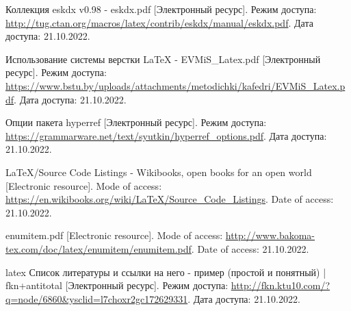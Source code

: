   \renewcommand{\addcontentsline}[3]{}%
  \renewcommand{\section}[2]{}%

  \begin{thebibliography}{}
    Коллекция eskdx v0.98 - eskdx.pdf
    [Электронный ресурс].
    Режим доступа: \url{http://tug.ctan.org/macros/latex/contrib/eskdx/manual/eskdx.pdf}.
    Дата доступа: 21.10.2022.
  
    Использование системы верстки LaTeX - EVMiS\_Latex.pdf
    [Электронный ресурс].
    Режим доступа: \url{https://www.bstu.by/uploads/attachments/metodichki/kafedri/EVMiS_Latex.pdf}.
    Дата доступа: 21.10.2022.
  
    Опции пакета hyperref
    [Электронный ресурс].
    Режим доступа: \url{https://grammarware.net/text/syutkin/hyperref_options.pdf}.
    Дата доступа: 21.10.2022.
  
    LaTeX/Source Code Listings - Wikibooks, open books for an open world
    [Electronic resource].
    Mode of access: \url{https://en.wikibooks.org/wiki/LaTeX/Source_Code_Listings}.
    Date of access: 21.10.2022.
  
    enumitem.pdf
    [Electronic resource].
    Mode of access: \url{http://www.bakoma-tex.com/doc/latex/enumitem/enumitem.pdf}.
    Date of access: 21.10.2022.
  
    latex Список литературы и ссылки на него - пример (простой и понятный) | fkn+antitotal
    [Электронный ресурс].
    Режим доступа: \url{http://fkn.ktu10.com/?q=node/6860&ysclid=l7choxr2gc172629331}.
    Дата доступа: 21.10.2022.
  \end{thebibliography}
\endgroup

\newpage
